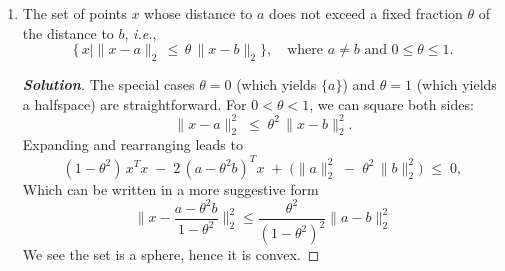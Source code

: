\documentclass[12pt]{article}
\newenvironment{Solution}
  {\begin{proof}[\textbf{Solution}]}
  {\end{proof}}
\begin{document}
\begin{enumerate}[label=(\alph*)]
	\item
	      The set of points \(x\) whose distance to \(a\) does not exceed a fixed fraction \(\theta\) of the distance to \(b\), \emph{i.e.},
	      \[
		      \{\,x \mid \|x - a\|_2 \,\le\, \theta\,\|x - b\|_2\},
		      \quad
		      \text{where }a \neq b
		      \text{ and } 0 \le \theta \le 1.
	      \]
	      \begin{Solution}
		      The special cases \(\theta = 0\) (which yields \(\{a\}\)) and \(\theta = 1\) (which yields a halfspace) are straightforward. For \(0 < \theta < 1\), we can square both sides:
		      \[
			      \|x - a\|_2^2
			      \;\le\;
			      \theta^2 \,\|x - b\|_2^2.
		      \]
		      Expanding and rearranging leads to
		      \[
			      (1 - \theta^2)\,x^T x
			      \;-\;
			      2\,(a - \theta^2 b)^T x
			      \;+\;
			      \bigl(\|a\|_2^2 \;-\;\theta^2\,\|b\|_2^2\bigr)
			      \;\le\;
			      0,
		      \]
		      Which can be written in a more suggestive form
		      \[
			      \|x - \frac{a-\theta^2 b}{1-\theta^2} \|_2^2 \leq \frac{\theta^2}{(1-\theta^2)^2} \|a-b\|_2^2
		      \]
		      We see the set is a sphere, hence it is convex.
	      \end{Solution}
\end{enumerate}

\vspace{0.15in}
\end{document}
